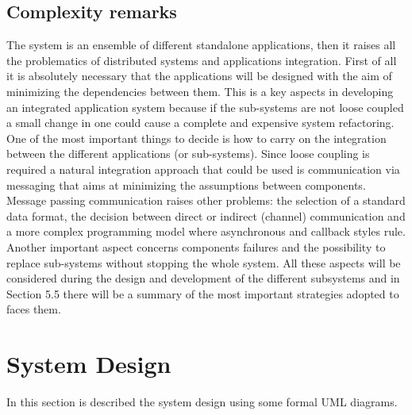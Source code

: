 \documentclass[11pt]{article}
\begin{document}
\subsection{Complexity remarks}
The system is an ensemble of different standalone applications, then it raises all the problematics of distributed systems and applications integration. First of all it is absolutely necessary that the applications will be designed with the aim of minimizing the dependencies between them. This is a key aspects in developing an integrated application system because if the sub-systems are not loose coupled a small change in one could cause a complete and expensive system refactoring. One of the most important things to decide is how to carry on the integration between the different applications (or sub-systems). Since loose coupling is required a natural integration approach that could be used is communication via messaging that aims at minimizing the assumptions between components. Message passing communication raises other problems: the selection of a standard data format, the decision between direct or indirect (channel) communication and a more complex programming model where asynchronous and callback styles rule. Another important aspect concerns components failures and the possibility to replace sub-systems without stopping the whole system. All these aspects will be considered during the design and development of the different subsystems and in Section 5.5 there will be a summary of the most important strategies adopted to faces them.

\section{System Design}
In this section is described the system design using some formal UML diagrams.
\end{document}
